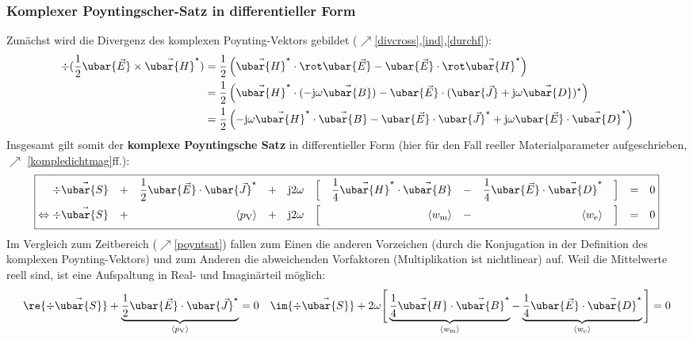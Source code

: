   \subsubsection{Komplexer Poyntingscher-Satz in differentieller Form}
		  Zunächst wird die Divergenz des komplexen Poynting-Vektors gebildet ($\nearrow$\ref{divcross},\ref{ind},\ref{durchf}):
			        \begin{equation}\begin{split}
					        \div (\frac{1}{2}\ubar{\vec{E}} \times \vec{\ubar{H}}^\star) &= \frac{1}{2} \left( \vec{\ubar{H}}^\star\cdot\rot \ubar{\vec{E}} - \ubar{\vec{E}}\cdot\rot \vec{\ubar{H}}^\star\right)\\
					        &= \frac{1}{2} \left( \vec{\ubar{H}}^\star\cdot (-\mathrm{j}\omega\vec{\ubar{B}}) - \ubar{\vec{E}}\cdot (\ubar{\vec{J}}+\mathrm{j}\omega\vec{\ubar{D}})^\star \right) \\
					        &= \frac{1}{2} \left( -\mathrm{j}\omega\vec{\ubar{H}}^\star\cdot \vec{\ubar{B}} - \ubar{\vec{E}}\cdot \ubar{\vec{J}}^\star + \mathrm{j}\omega\ubar{\vec{E}}\cdot \vec{\ubar{D}}^\star \right)
				        \end{split}\end{equation}
			  Insgesamt gilt somit der \textbf{komplexe Poyntingsche Satz} in differentieller Form (hier für den Fall reeller Materialparameter aufgeschrieben, $\nearrow$ \ref{kompledichtmag}ff.):
			        \begin{equation}\boxed{\begin{split}
				       \div \vec{\ubar{S}}                &  & + &  & \frac{1}{2} \ubar{\vec{E}}\cdot \ubar{\vec{J}}^\star &  & + &  & \mathrm{j}2\omega &  & \Big[ &  & \frac{1}{4} \vec{\ubar{H}}^\star\cdot\vec{\ubar{B}} &  & - &  & \frac{1}{4} \ubar{\vec{E}}\cdot \vec{\ubar{D}}^\star &  & \Big] &  & = &  & 0 \\
				        \Leftrightarrow \div \vec{\ubar{S}} &  & + &  & \langle p_\text{V} \rangle  &  & + &  & \mathrm{j}2\omega &  & \Big[ &  & \langle w_\text{m}\rangle  &  & - &  & \langle w_\text{e}\rangle    &  & \Big] &  & = &  & 0
			        \end{split}}\end{equation}
			  Im Vergleich zum Zeitbereich ($\nearrow$\ref{poyntsat}) fallen zum Einen die anderen Vorzeichen (durch die Konjugation in der Definition des komplexen Poynting-Vektors) und zum Anderen die abweichenden Vorfaktoren (Multiplikation ist nichtlinear) auf. Weil die Mittelwerte reell sind, ist eine Aufspaltung in Real- und Imaginärteil möglich:
			        \begin{equation}\begin{split}
					        \re{\div \vec{\ubar{S}}} + \underbrace{\frac{1}{2} \ubar{\vec{E}}\cdot \ubar{\vec{J}}^\star}_{\langle p_\text{V} \rangle} =0 \quad  \im{\div \vec{\ubar{S}}} + 2\omega\Bigg[\underbrace{\frac{1}{4} \vec{\ubar{H}}\cdot\vec{\ubar{B}}^\star}_{\langle w_\text{m}\rangle} - \underbrace{\frac{1}{4} \ubar{\vec{E}}\cdot \vec{\ubar{D}}^\star}_{\langle w_\text{e}\rangle} \Bigg] =0
				        \end{split}\end{equation}
